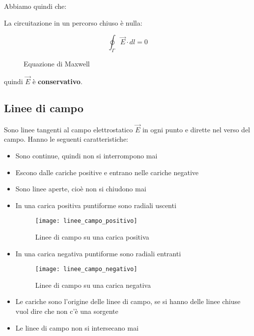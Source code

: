 \documentclass[a4paper]{article}
\begin{document}
Abbiamo quindi che:
\begin{figure}[H]
  \centering
\end{figure}
\noindent
La circuitazione in un percorso chiuso è nulla:
\begin{figure}[H]
  \[
    \oint_{\Gamma} \vec{E} \cdot dl = 0
  \] 
  \caption{Equazione di Maxwell}
\end{figure}
quindi \( \vec{E} \) è \textbf{conservativo}.

\subsection{Linee di campo}
Sono linee tangenti al campo elettrostatico \( \vec{E} \) in ogni punto e dirette
nel verso del campo. Hanno le seguenti caratteristiche:
\begin{itemize}
  \item Sono continue, quindi non si interrompono mai
  \item Escono dalle cariche positive e entrano nelle cariche negative
  \item Sono linee aperte, cioè non si chiudono mai

  \item In una carica positiva puntiforme sono radiali uscenti
    \begin{figure}[H]
      \centering
      \texttt{[image: linee\_campo\_positivo]}
      \caption{Linee di campo su una carica positiva}
    \end{figure}

  \item In una carica negativa puntiforme sono radiali entranti
    \begin{figure}[H]
      \centering
      \texttt{[image: linee\_campo\_negativo]}
      \caption{Linee di campo su una carica negativa}
    \end{figure}

  \item Le cariche sono l'origine delle linee di campo, se si hanno delle linee chiuse
    vuol dire che non c'è una sorgente

  \item Le linee di campo non si intersecano mai
\end{itemize}
\end{document}
